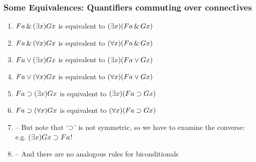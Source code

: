 \begin{frame}
\frametitle{Some Equivalences: Quantifiers commuting over connectives}

\begin{enumerate}[<+->]

\item $Fa \,\&\, (\exists x)Gx$ is equivalent to $(\exists x)(Fa \,\&\, Gx)$

\item $Fa \,\&\, (\forall x)Gx$ is equivalent to $(\forall x)(Fa \,\&\, Gx)$

\item $Fa \vee (\exists x)Gx$ is equivalent to $(\exists x)(Fa \vee Gx)$

\item $Fa \vee (\forall x)Gx$ is equivalent to $(\forall x)(Fa \vee Gx)$

\item $Fa \supset (\exists x)Gx$ is equivalent to $(\exists x)(Fa \supset Gx)$

\item $Fa \supset (\forall x)Gx$ is equivalent to $(\forall x)(Fa \supset Gx)$

\item[] -- But note that `$\supset$' is not symmetric, so we have to examine the converse: e.g. $(\exists x)Gx \supset Fa$!

\item[] -- And there are no analogous rules for biconditionals 


\end{enumerate}
\end{frame}

